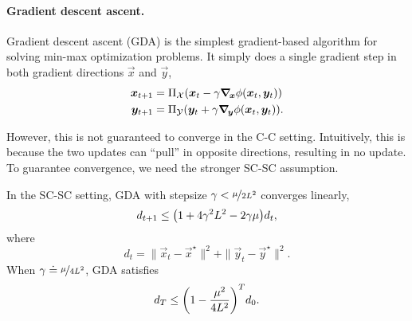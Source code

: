 \paragraph{Gradient descent ascent.}

Gradient descent ascent (GDA) is the simplest gradient-based algorithm for solving min-max
optimization problems. It simply does a single gradient step in both gradient directions \wrt
$\vec{x}$ and $\vec{y}$,
\begin{align*}
    \vec{x}_{t+1} & = \Pi_{\mathcal{X}}(\vec{x}_t - \gamma \grad{\phi(\vec{x}_t, \vec{y}_t)}{\vec{x}})  \\
    \vec{y}_{t+1} & = \Pi_{\mathcal{Y}}(\vec{y}_t + \gamma \grad{\phi(\vec{x}_t, \vec{y}_t)}{\vec{y}}).
\end{align*}

However, this is not guaranteed to converge in the C-C setting. Intuitively, this is because the
two updates can ``pull'' in opposite directions, resulting in no update. To guarantee convergence,
we need the stronger SC-SC assumption.

\begin{theorem}
    In the SC-SC setting, GDA with stepsize $\gamma < \nicefrac{\mu}{2L^2}$ converges linearly,
    \begin{align*}
        d_{t+1} \leq \lft( 1 + 4 \gamma^2 L^2 - 2 \gamma \mu \rgt) d_t,
    \end{align*}
    where \[
        d_t = \| \vec{x}_t - \vec{x}^\star \|^2 + \| \vec{y}_t - \vec{y}^\star \|^2.
    \]
    When $\gamma \doteq \nicefrac{\mu}{4 L^2}$, GDA satisfies \[
        d_T \leq \lft( 1 - \frac{\mu^2}{4L^2} \rgt)^T d_0.
    \]
\end{theorem}

